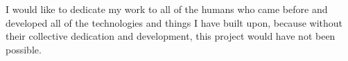 I would like to dedicate my work to all of the humans who came before and developed all of the technologies and things I have built upon, because without their collective dedication and development, this project would have not been possible.

